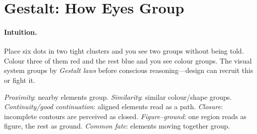 \section{Gestalt: How Eyes Group}
\label{sec:gestalt}
\paragraph{Intuition.} Place six dots in two tight clusters and you see two groups without being told. Colour three of them red and the rest blue and you see colour groups. The visual system groups by \emph{Gestalt laws} before conscious reasoning---design can recruit this or fight it.

\begin{definition}\label{def:gestalt}
\emph{Proximity}: nearby elements group. \emph{Similarity}: similar colour/shape groups. \emph{Continuity/good continuation}: aligned elements read as a path. \emph{Closure}: incomplete contours are perceived as closed. \emph{Figure--ground}: one region reads as figure, the rest as ground. \emph{Common fate}: elements moving together group.
\end{definition}

